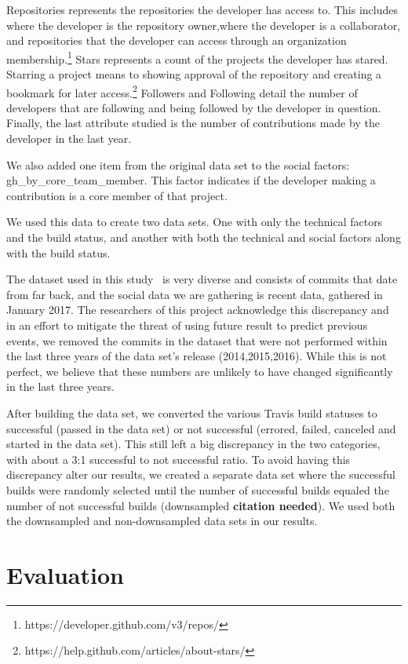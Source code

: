 \documentclass[10pt, conference]{IEEEtran}
\newcommand{\todo}[1]
  {{\scriptsize \textbf{\color{red} {#1}}}}
\begin{document}
Repositories represents the repositories the developer has access to. This 
includes where the developer is the repository owner,where the developer is a 
collaborator, and repositories that the developer can access through an 
organization membership.\footnote{https://developer.github.com/v3/repos/} Stars 
represents a count of the projects the developer has stared. Starring  a project
means to showing approval of the repository and creating a bookmark for later 
access.\footnote{https://help.github.com/articles/about-stars/} Followers and 
Following detail the number of developers that are following and being followed 
by the developer in question. Finally, the last attribute studied is the number 
of contributions made by the developer in the last year. 

We also added one item from the original data set to the social factors:
gh\_by\_core\_team\_member.
This factor indicates if the developer making a contribution is a core member 
of that project.

We used this data to create two data sets.  One with only the technical
factors and the build status, and another with both the technical and social
factors along with the build status.

The dataset used in this study~\cite{msr17challenge} is very diverse 
and consists of commits that date from far back, and the social data we are 
gathering is recent data, gathered in January 2017. The researchers of this 
project acknowledge this discrepancy and in an effort to mitigate the threat of
using future result to predict previous events,
we removed the commits in the dataset that were not performed within the last
three years of the data set's release (2014,2015,2016).  While this is not
perfect, we believe that these numbers are unlikely to have changed
significantly in the last three years.

After building the data set, we converted the various Travis build statuses to
successful (passed in the data set) or not successful (errored, failed, canceled
and started in the data set).  This still left a big discrepancy in the two
categories, with about a 3:1 successful to not successful ratio. To avoid having
this discrepancy alter our results, we created a separate data set where the
successful builds were randomly selected until the number of successful builds
equaled the number of not successful builds (downsampled\todo{citation needed}).  We used both the
downsampled and non-downsampled data sets in our results.


\section{Evaluation}
\end{document}
